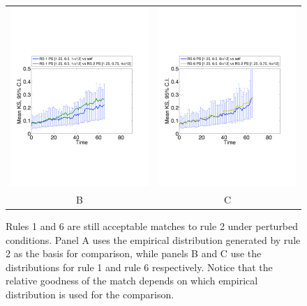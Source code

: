 \documentclass[12pt]{article}
\begin{document}
\begin{figure}[htp]
\begin{tabular}{cc}
	\includegraphics[width=3.25in]{figures/KSstatPerturb_RS01PS013_vs_RS02PS027.pdf} & \includegraphics[width=3.25in]{figures/KSstatPerturb_RS06PS012_vs_RS02PS027.pdf}\\
	B & C \\
\end{tabular}
\caption{Rules 1 and 6 are still acceptable matches to rule 2 under perturbed conditions. Panel A uses the empirical distribution generated by rule 2 as the basis for comparison, while panels B and C use the distributions for rule 1 and rule 6 respectively. Notice that the relative goodness of the match depends on which empirical distribution is used for the comparison.}
\label{ksperturb}
\end{figure}
\end{document}
